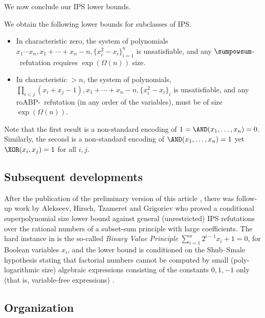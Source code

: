 \documentclass{toc}
\begin{document}
We now conclude our IPS lower bounds.

\begin{theorem}
        We obtain the following lower bounds for subclasses of IPS.

        \begin{itemize}
                \item In characteristic zero, the system of polynomials $x_1\cdots x_n,x_1+\cdots+x_n-n,\{x_i^2-x_i\}_{i=1}^n$ is unsatisfiable, and any $\sumpowsum$-\IPS\ refutation requires
$\exp(\Omega(n))$ size.

                \item In characteristic $>n$, the system of polynomials, $\prod_{i<j}(x_i+x_j-1),x_1+\cdots+x_n-n,\{x_i^2-x_i\}_i$ is unsatisfiable, and any roABP-\IPS\ refutation (in any order of the variables),
must be of size $\exp(\Omega(n))$.
                        \qedhere
        \end{itemize}
\end{theorem}

Note that the first result is a non-standard encoding of $1=\AND(x_1,\ldots,x_n)=0$. Similarly, the second is a non-standard encoding of $\AND(x_1,\ldots,x_n)=1$ yet $\XOR(x_i,x_j)=1$ for all $i,j$.


\subsection{Subsequent developments}
After the %
publication  %
of the preliminary version of this article \cite{FSTW16},
there was %
%
follow-up work by Alekseev, Hirsch, Tzameret and Grigoriev \cite{AGHT19} who proved a conditional superpolynomial size lower bound against general (unrestricted)  IPS refutations over the rational numbers of a %
%
subset-sum  %
principle with large coefficients. The hard instance in \cite{AGHT19} is the so-called \emph{Binary Value Principle} $\sum_{i=1}^n 2^{i-1}x_i+1=0$, for Boolean %
variables $x_i$,  %
and the lower bound is conditioned on the Shub--Smale hypothesis stating that  factorial numbers cannot be computed by small (poly-logarithmic size)  algebraic expressions consisting of the constants $0,1,-1$ only (that is, variable-free expressions) \cite{SS95}. %
%
%


\subsection{Organization}
\end{document}
